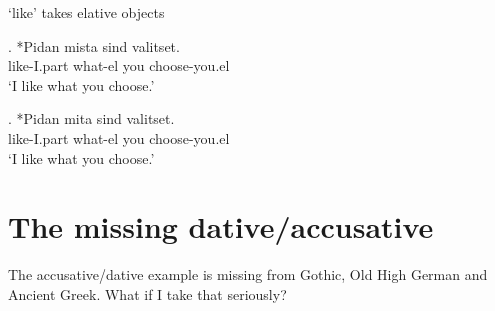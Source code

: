  `like' takes elative objects

\exg. *Pidan mista sind valitset.\\
like-I.part what-el you choose-you.el\\
`I like what you choose.'

\exg. *Pidan mita sind valitset.\\
like-I.part what-el you choose-you.el\\
`I like what you choose.'




\section{The missing dative/accusative}

The accusative/dative example is missing from Gothic, Old High German and Ancient Greek. What if I take that seriously?

